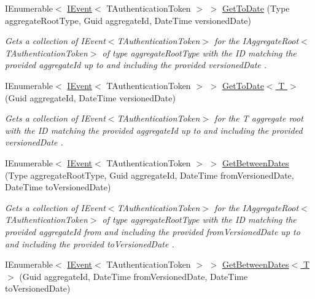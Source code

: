 \begin{DoxyCompactItemize}
I\+Enumerable$<$ \hyperlink{interfaceCqrs_1_1Events_1_1IEvent}{I\+Event}$<$ T\+Authentication\+Token $>$ $>$ \hyperlink{classCqrs_1_1EventStore_1_1EventStore_ac7208e6397e7f9145dfc03b27a2615b8_ac7208e6397e7f9145dfc03b27a2615b8}{Get\+To\+Date} (Type aggregate\+Root\+Type, Guid aggregate\+Id, Date\+Time versioned\+Date)
\begin{DoxyCompactList}\small\item\em Gets a collection of I\+Event$<$\+T\+Authentication\+Token$>$ for the I\+Aggregate\+Root$<$\+T\+Authentication\+Token$>$ of type {\itshape aggregate\+Root\+Type}  with the ID matching the provided {\itshape aggregate\+Id}  up to and including the provided {\itshape versioned\+Date} . \end{DoxyCompactList}\item 
I\+Enumerable$<$ \hyperlink{interfaceCqrs_1_1Events_1_1IEvent}{I\+Event}$<$ T\+Authentication\+Token $>$ $>$ \hyperlink{classCqrs_1_1EventStore_1_1EventStore_aaaa0b3c21d7ad3732af466dda82af5b9_aaaa0b3c21d7ad3732af466dda82af5b9}{Get\+To\+Date$<$ T $>$} (Guid aggregate\+Id, Date\+Time versioned\+Date)
\begin{DoxyCompactList}\small\item\em Gets a collection of I\+Event$<$\+T\+Authentication\+Token$>$ for the {\itshape T} aggregate root with the ID matching the provided {\itshape aggregate\+Id}  up to and including the provided {\itshape versioned\+Date} . \end{DoxyCompactList}\item 
I\+Enumerable$<$ \hyperlink{interfaceCqrs_1_1Events_1_1IEvent}{I\+Event}$<$ T\+Authentication\+Token $>$ $>$ \hyperlink{classCqrs_1_1EventStore_1_1EventStore_afa60a199a0c4329278ae91625ae81ed2_afa60a199a0c4329278ae91625ae81ed2}{Get\+Between\+Dates} (Type aggregate\+Root\+Type, Guid aggregate\+Id, Date\+Time from\+Versioned\+Date, Date\+Time to\+Versioned\+Date)
\begin{DoxyCompactList}\small\item\em Gets a collection of I\+Event$<$\+T\+Authentication\+Token$>$ for the I\+Aggregate\+Root$<$\+T\+Authentication\+Token$>$ of type {\itshape aggregate\+Root\+Type}  with the ID matching the provided {\itshape aggregate\+Id}  from and including the provided {\itshape from\+Versioned\+Date}  up to and including the provided {\itshape to\+Versioned\+Date} . \end{DoxyCompactList}\item 
I\+Enumerable$<$ \hyperlink{interfaceCqrs_1_1Events_1_1IEvent}{I\+Event}$<$ T\+Authentication\+Token $>$ $>$ \hyperlink{classCqrs_1_1EventStore_1_1EventStore_a1719bd68025a3ada1d0ab0f50f41ef7f_a1719bd68025a3ada1d0ab0f50f41ef7f}{Get\+Between\+Dates$<$ T $>$} (Guid aggregate\+Id, Date\+Time from\+Versioned\+Date, Date\+Time to\+Versioned\+Date)

\end{DoxyCompactItemize}
